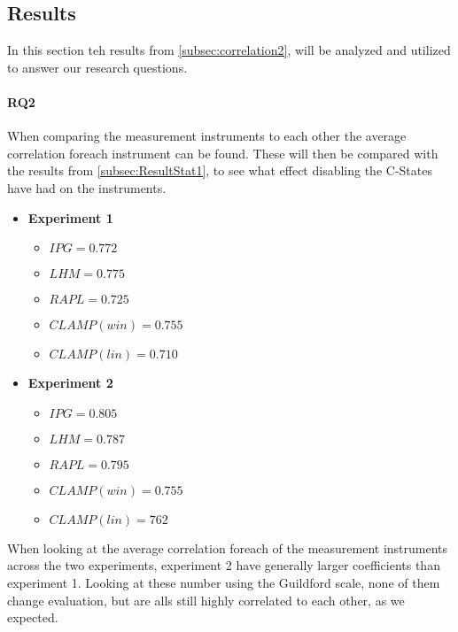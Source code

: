 \subsection{Results}\label{subsec:ResultStat2}  
In this section teh results from \cref{subsec:correlation2}, will be analyzed and utilized to answer our research questions. 
\paragraph{RQ2}
When comparing the measurement instruments to each other the average correlation foreach instrument can be found. These will then be compared with the results from \cref{subsec:ResultStat1}, to see what effect disabling the C-States have had on the instruments.
\begin{itemize}
    \item \textbf{Experiment 1}
    \begin{itemize}
        \item $IPG = 0.772$ %
        \item $LHM = 0.775$ %
        \item $RAPL = 0.725$ %
        \item $CLAMP(win) = 0.755$ %
        \item $CLAMP(lin) = 0.710$ %
    \end{itemize}
    \item \textbf{Experiment 2}
    \begin{itemize}
        \item $IPG = 0.805$ %
        \item $LHM = 0.787$ %
        \item $RAPL = 0.795$%
        \item $CLAMP(win) = 0.755$ %
        \item $CLAMP(lin) = 762$ %
    \end{itemize}
\end{itemize}
When looking at the average correlation foreach of the measurement instruments across the two experiments, experiment 2 have generally larger coefficients than experiment 1. Looking at these number using the Guildford scale, none of them change evaluation, but are alls still highly correlated to each other, as we expected.

